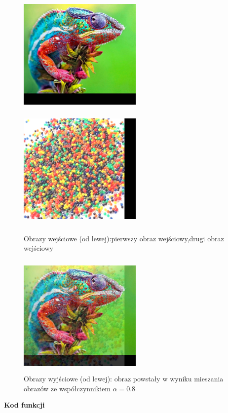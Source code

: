 \documentclass[magisterska,openany]{pracadypl}
\begin{document}
\newpage
\begin{figure}[h]
\centering
\includegraphics[width=6cm, height=6cm]{2_4/ResolRGB3.jpg}
\includegraphics[width=6cm, height=6cm]{2_4/ResolRGB4.jpg}
\caption{Obrazy wejściowe (od lewej):pierwszy obraz wejściowy,drugi obraz wejściowy}
\end{figure}
\begin{figure}[h]
\centering
\includegraphics[width=6cm, height=6cm]{4_5/mixRGB2.jpg}
\caption{Obrazy wyjściowe (od lewej): obraz powstały w wyniku
mieszania obrazów ze współczynnikiem $\alpha=0.8$}
\end{figure}

\newpage
\textbf{\Large Kod funkcji}
   
\end{document}
